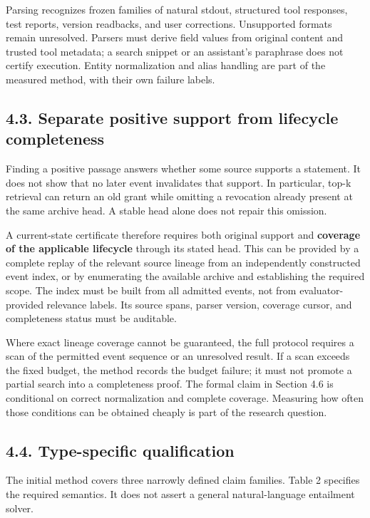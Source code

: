 \documentclass[
  11pt,
  a4paper,
]{article}
\begin{document}
Parsing recognizes frozen families of natural stdout, structured tool
responses, test reports, version readbacks, and user corrections.
Unsupported formats remain unresolved. Parsers must derive field values
from original content and trusted tool metadata; a search snippet or an
assistant's paraphrase does not certify execution. Entity normalization
and alias handling are part of the measured method, with their own
failure labels.

\subsection{4.3. Separate positive support from lifecycle
completeness}\label{separate-positive-support-from-lifecycle-completeness}

Finding a positive passage answers whether some source supports a
statement. It does not show that no later event invalidates that
support. In particular, top-k retrieval can return an old grant while
omitting a revocation already present at the same archive head. A stable
head alone does not repair this omission.

A current-state certificate therefore requires both original support and
\textbf{coverage of the applicable lifecycle} through its stated head.
This can be provided by a complete replay of the relevant source lineage
from an independently constructed event index, or by enumerating the
available archive and establishing the required scope. The index must be
built from all admitted events, not from evaluator-provided relevance
labels. Its source spans, parser version, coverage cursor, and
completeness status must be auditable.

Where exact lineage coverage cannot be guaranteed, the full protocol
requires a scan of the permitted event sequence or an unresolved result.
If a scan exceeds the fixed budget, the method records the budget
failure; it must not promote a partial search into a completeness proof.
The formal claim in Section 4.6 is conditional on correct normalization
and complete coverage. Measuring how often those conditions can be
obtained cheaply is part of the research question.

\subsection{4.4. Type-specific
qualification}\label{type-specific-qualification}

The initial method covers three narrowly defined claim families. Table 2
specifies the required semantics. It does not assert a general
natural-language entailment solver.
\end{document}
